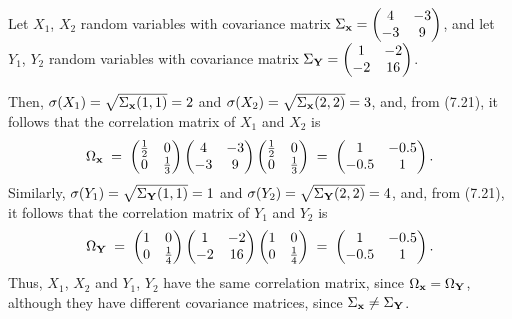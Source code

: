 \begin{examplex}
Let $X_1$, $X_2$ random variables with covariance matrix $\Sigma_{\mathbf{x}} =
\begin{pmatrix} 4 & -3 \\ -3 & 9 \end{pmatrix}$,
and let $Y_1$, $Y_2$ random variables with covariance matrix $\Sigma_{\mathbf{Y}} =
\begin{pmatrix} 1 & -2 \\ -2 & 16 \end{pmatrix}$.

Then, $\sigma(X_1) = \sqrt{\Sigma_{\mathbf{x}}(1,1)} = 2$ and $\sigma(X_2) =
\sqrt{\Sigma_{\mathbf{x}}(2,2)} = 3$, and, from (7.21), it follows that the correlation
matrix of $X_1$ and $X_2$ is
\[
\Omega_{\mathbf{x}} \;=\; \begin{pmatrix} \frac12 & 0 \\ 0 & \frac13 \end{pmatrix}
\begin{pmatrix} 4 & -3 \\ -3 & 9 \end{pmatrix}
\begin{pmatrix} \frac12 & 0 \\ 0 & \frac13 \end{pmatrix}
\;=\; \begin{pmatrix} 1 & -0.5 \\ -0.5 & 1 \end{pmatrix}.
\]
Similarly, $\sigma(Y_1) = \sqrt{\Sigma_{\mathbf{Y}}(1,1)} = 1$ and $\sigma(Y_2) =
\sqrt{\Sigma_{\mathbf{Y}}(2,2)} = 4$, and, from (7.21), it follows that the correlation
matrix of $Y_1$ and $Y_2$ is
\[
\Omega_{\mathbf{Y}} \;=\; \begin{pmatrix} 1 & 0 \\ 0 & \frac14 \end{pmatrix}
\begin{pmatrix} 1 & -2 \\ -2 & 16 \end{pmatrix}
\begin{pmatrix} 1 & 0 \\ 0 & \frac14 \end{pmatrix}
\;=\; \begin{pmatrix} 1 & -0.5 \\ -0.5 & 1 \end{pmatrix}.
\]
Thus, $X_1$, $X_2$ and $Y_1$, $Y_2$ have the same correlation matrix, since
$\Omega_{\mathbf{x}} = \Omega_{\mathbf{Y}}$, although they have different covariance matrices,
since $\Sigma_{\mathbf{x}} \neq \Sigma_{\mathbf{Y}}$.
\end{examplex}

